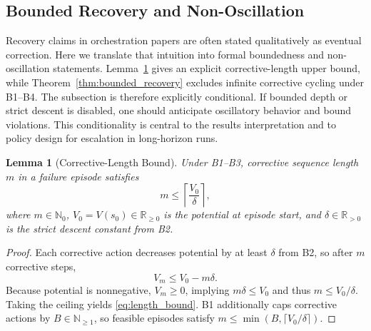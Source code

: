 \documentclass{article} %
\newtheorem{lemma}[theorem]{Lemma}
\begin{document}
\subsection{Bounded Recovery and Non-Oscillation}
Recovery claims in orchestration papers are often stated qualitatively as eventual correction. Here we translate that intuition into formal boundedness and non-oscillation statements. Lemma~\ref{lem:length_bound} gives an explicit corrective-length upper bound, while Theorem~\ref{thm:bounded_recovery} excludes infinite corrective cycling under B1--B4.
The subsection is therefore explicitly conditional. If bounded depth or strict descent is disabled, one should anticipate oscillatory behavior and bound violations. This conditionality is central to the results interpretation and to policy design for escalation in long-horizon runs.
\begin{lemma}[Corrective-Length Bound]
\label{lem:length_bound}
Under B1--B3, corrective sequence length $m$ in a failure episode satisfies
\begin{equation}
m \le \left\lceil \frac{V_0}{\delta} \right\rceil,
\label{eq:length_bound}
\end{equation}
where $m\in\mathbb{N}_0$, $V_0=V(s_0)\in\mathbb{R}_{\ge0}$ is the potential at episode start, and $\delta\in\mathbb{R}_{>0}$ is the strict descent constant from B2.
\end{lemma}
\begin{proof}
Each corrective action decreases potential by at least $\delta$ from B2, so after $m$ corrective steps,
\begin{equation}
V_m \le V_0 - m\delta.
\label{eq:telescoping}
\end{equation}
Because potential is nonnegative, $V_m\ge 0$, implying $m\delta\le V_0$ and thus $m\le V_0/\delta$. Taking the ceiling yields \eqref{eq:length_bound}. B1 additionally caps corrective actions by $B\in\mathbb{N}_{\ge1}$, so feasible episodes satisfy $m\le\min(B,\lceil V_0/\delta\rceil)$.\qedhere
\end{proof}
\end{document}
